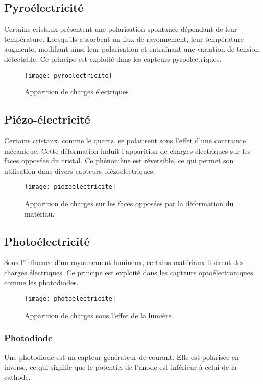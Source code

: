 \subsection*{Pyroélectricité}
Certains cristaux présentent une polarisation spontanée dépendant de leur 
température. Lorsqu'ils absorbent un flux de rayonnement, leur température 
augmente, modifiant ainsi leur polarisation et entraînant une variation de 
tension détectable.  
Ce principe est exploité dans les capteurs pyroélectriques.

\begin{figure}[H]
    \centering
    \texttt{[image: pyroelectricite]}
    \caption{Apparition de charges électriques}
    \label{figPyroelectricite}
\end{figure}

\subsection*{Piézo-électricité}
Certains cristaux, comme le quartz, se polarisent sous l'effet d'une contrainte 
mécanique. Cette déformation induit l'apparition de charges électriques sur les 
faces opposées du cristal.  
Ce phénomène est réversible, ce qui permet son utilisation dans divers capteurs 
piézoélectriques.

\begin{figure}[H]
    \centering
    \texttt{[image: piezoelectricite]}
    \caption{Apparition de charges sur les faces opposées par la déformation du matériau.}
    \label{figPiezoelectricite}
\end{figure}

\subsection*{Photoélectricité}
Sous l'influence d'un rayonnement lumineux, certains matériaux libèrent des 
charges électriques. Ce principe est exploité dans les capteurs optoélectroniques
comme les photodiodes.

\begin{figure}[H]
    \centering
    \texttt{[image: photoelectricite]}
    \caption{Apparition de charges sous l'effet de la lumière}
    \label{figPhotoelectricite}
\end{figure}

\subsubsection{Photodiode}
Une photodiode est un capteur générateur de courant. Elle est polarisée en 
inverse, ce qui signifie que le potentiel de l'anode est inférieur à celui de la 
cathode.  

